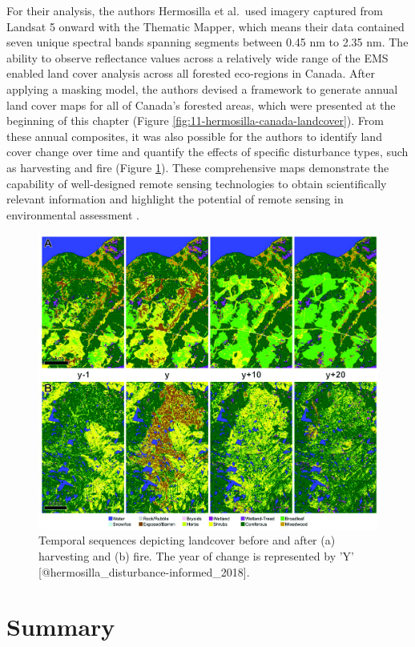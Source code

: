 \documentclass[
]{book}
\begin{document}
For their analysis, the authors Hermosilla et al.~used imagery captured from Landsat 5 onward with the Thematic Mapper, which means their data contained seven unique spectral bands spanning segments between 0.45 nm to 2.35 nm. The ability to observe reflectance values across a relatively wide range of the EMS enabled land cover analysis across all forested eco-regions in Canada. After applying a masking model, the authors devised a framework to generate annual land cover maps for all of Canada's forested areas, which were presented at the beginning of this chapter (Figure \ref{fig:11-hermosilla-canada-landcover}). From these annual composites, it was also possible for the authors to identify land cover change over time and quantify the effects of specific disturbance types, such as harvesting and fire (Figure \ref{fig:11-hermo-disturb}). These comprehensive maps demonstrate the capability of well-designed remote sensing technologies to obtain scientifically relevant information and highlight the potential of remote sensing in environmental assessment \citep{hermosilla_disturbance-informed_2018}.

\begin{figure}
\includegraphics[width=0.9\linewidth]{images/11-hermo-disturbance} \caption{Temporal sequences depicting landcover before and after (a) harvesting and (b) fire. The year of change is represented by 'Y' [@hermosilla_disturbance-informed_2018].}\label{fig:11-hermo-disturb}
\end{figure}

\section{Summary}\label{summary-3}
\end{document}
